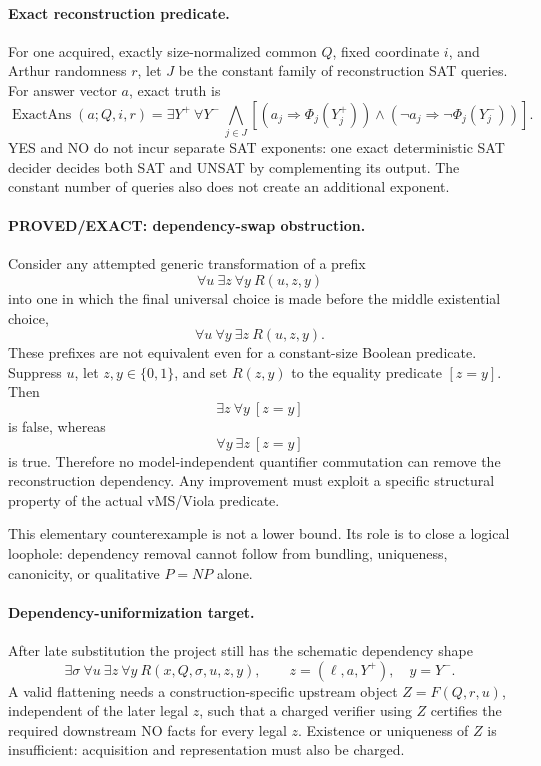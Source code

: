 \documentclass[11pt]{article}
\begin{document}
\paragraph{Exact reconstruction predicate.}
For one acquired, exactly size-normalized common $Q$, fixed coordinate $i$, and Arthur randomness $r$, let $J$ be the constant family of reconstruction SAT queries. For answer vector $a$, exact truth is
\[
\operatorname{ExactAns}(a;Q,i,r)
=
\exists Y^+\ \forall Y^-\
\bigwedge_{j\in J}
\left[(a_j\Rightarrow\Phi_j(Y_j^+))\wedge
(\neg a_j\Rightarrow\neg\Phi_j(Y_j^-))\right].
\]
YES and NO do not incur separate SAT exponents: one exact deterministic SAT decider decides both SAT and UNSAT by complementing its output. The constant number of queries also does not create an additional exponent.

\paragraph{PROVED/EXACT: dependency-swap obstruction.}
Consider any attempted generic transformation of a prefix
\[\forall u\ \exists z\ \forall y\ R(u,z,y)\]
into one in which the final universal choice is made before the middle existential choice,
\[\forall u\ \forall y\ \exists z\ R(u,z,y).\]
These prefixes are not equivalent even for a constant-size Boolean predicate. Suppress $u$, let $z,y\in\{0,1\}$, and set $R(z,y)$ to the equality predicate $[z=y]$. Then
\[\exists z\ \forall y\ [z=y]\]
is false, whereas
\[\forall y\ \exists z\ [z=y]\]
is true. Therefore no model-independent quantifier commutation can remove the reconstruction dependency. Any improvement must exploit a specific structural property of the actual vMS/Viola predicate.

This elementary counterexample is not a lower bound. Its role is to close a logical loophole: dependency removal cannot follow from bundling, uniqueness, canonicity, or qualitative $P=NP$ alone.

\paragraph{Dependency-uniformization target.}
After late substitution the project still has the schematic dependency shape
\[
\boxed{\exists\sigma\ \forall u\ \exists z\ \forall y\ R(x,Q,\sigma,u,z,y)},
\qquad z=(\ell,a,Y^+),\quad y=Y^-.
\]
A valid flattening needs a construction-specific upstream object $Z=F(Q,r,u)$, independent of the later legal $z$, such that a charged verifier using $Z$ certifies the required downstream NO facts for every legal $z$. Existence or uniqueness of $Z$ is insufficient: acquisition and representation must also be charged.
\end{document}
